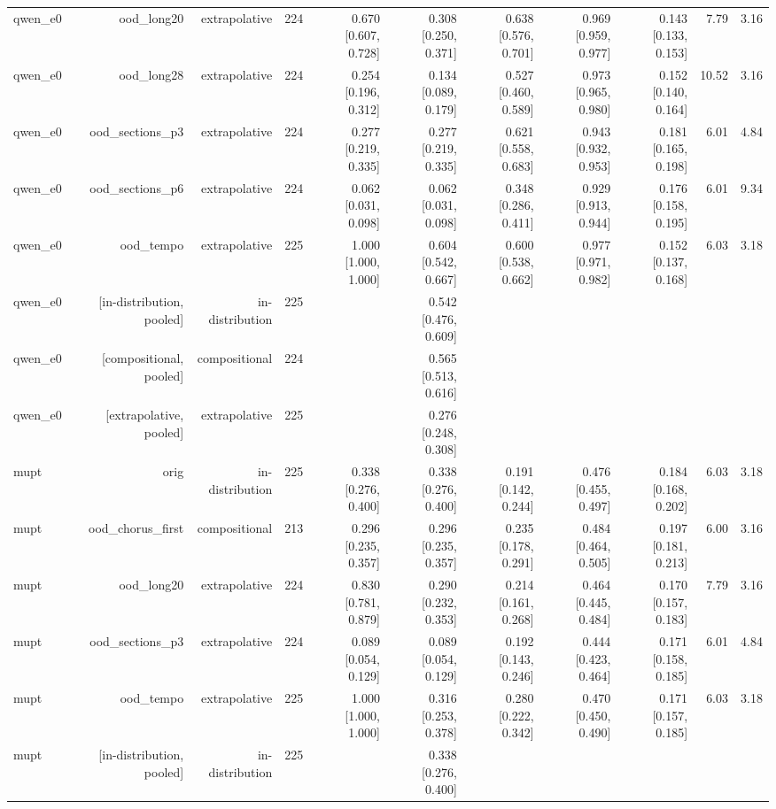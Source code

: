 \begin{table}[t]
\begin{tabular}{lrrrrrrrrrr}
qwen\_e0 & ood\_long20 & extrapolative & 224 & 0.670 [0.607, 0.728] & 0.308 [0.250, 0.371] & 0.638 [0.576, 0.701] & 0.969 [0.959, 0.977] & 0.143 [0.133, 0.153] & 7.79 & 3.16 \\
qwen\_e0 & ood\_long28 & extrapolative & 224 & 0.254 [0.196, 0.312] & 0.134 [0.089, 0.179] & 0.527 [0.460, 0.589] & 0.973 [0.965, 0.980] & 0.152 [0.140, 0.164] & 10.52 & 3.16 \\
qwen\_e0 & ood\_sections\_p3 & extrapolative & 224 & 0.277 [0.219, 0.335] & 0.277 [0.219, 0.335] & 0.621 [0.558, 0.683] & 0.943 [0.932, 0.953] & 0.181 [0.165, 0.198] & 6.01 & 4.84 \\
qwen\_e0 & ood\_sections\_p6 & extrapolative & 224 & 0.062 [0.031, 0.098] & 0.062 [0.031, 0.098] & 0.348 [0.286, 0.411] & 0.929 [0.913, 0.944] & 0.176 [0.158, 0.195] & 6.01 & 9.34 \\
qwen\_e0 & ood\_tempo & extrapolative & 225 & 1.000 [1.000, 1.000] & 0.604 [0.542, 0.667] & 0.600 [0.538, 0.662] & 0.977 [0.971, 0.982] & 0.152 [0.137, 0.168] & 6.03 & 3.18 \\
qwen\_e0 & [in-distribution, pooled] & in-distribution & 225 &  & 0.542 [0.476, 0.609] &  &  &  &  &  \\
qwen\_e0 & [compositional, pooled] & compositional & 224 &  & 0.565 [0.513, 0.616] &  &  &  &  &  \\
qwen\_e0 & [extrapolative, pooled] & extrapolative & 225 &  & 0.276 [0.248, 0.308] &  &  &  &  &  \\
mupt & orig & in-distribution & 225 & 0.338 [0.276, 0.400] & 0.338 [0.276, 0.400] & 0.191 [0.142, 0.244] & 0.476 [0.455, 0.497] & 0.184 [0.168, 0.202] & 6.03 & 3.18 \\
mupt & ood\_chorus\_first & compositional & 213 & 0.296 [0.235, 0.357] & 0.296 [0.235, 0.357] & 0.235 [0.178, 0.291] & 0.484 [0.464, 0.505] & 0.197 [0.181, 0.213] & 6.00 & 3.16 \\
mupt & ood\_long20 & extrapolative & 224 & 0.830 [0.781, 0.879] & 0.290 [0.232, 0.353] & 0.214 [0.161, 0.268] & 0.464 [0.445, 0.484] & 0.170 [0.157, 0.183] & 7.79 & 3.16 \\
mupt & ood\_sections\_p3 & extrapolative & 224 & 0.089 [0.054, 0.129] & 0.089 [0.054, 0.129] & 0.192 [0.143, 0.246] & 0.444 [0.423, 0.464] & 0.171 [0.158, 0.185] & 6.01 & 4.84 \\
mupt & ood\_tempo & extrapolative & 225 & 1.000 [1.000, 1.000] & 0.316 [0.253, 0.378] & 0.280 [0.222, 0.342] & 0.470 [0.450, 0.490] & 0.171 [0.157, 0.185] & 6.03 & 3.18 \\
mupt & [in-distribution, pooled] & in-distribution & 225 &  & 0.338 [0.276, 0.400] &  &  &  &  &  \\

\end{tabular}
\end{table}
